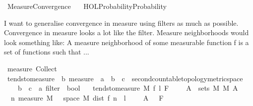 %
\begin{isabellebody}%
%
%
\isadelimtheory
%
\endisadelimtheory
%
\isatagtheory
{}\isamarkupfalse%
\ Measure{\isacharunderscore}{\kern0pt}Convergence\isanewline
\ \ \ {\isachardoublequoteopen}HOL{\isacharminus}{\kern0pt}Probability{\isachardot}{\kern0pt}Probability{\isachardoublequoteclose}\isanewline
{}%
\endisatagtheory
{\isafoldtheory}%
%
\isadelimtheory
%
\endisadelimtheory
%
\begin{isamarkuptext}%
I want to generalise convergence in measure using filters as much as possible. Convergence 
 in measure looks a lot like the  filter. Measure neighborhoods would look something like:
 A measure neighborhood of some measurable function f is a set of functions such that ...%
\end{isamarkuptext}\isamarkuptrue%
\isamarkupfalse%
\ measure\ Collect\isanewline
\isanewline
{}\isamarkupfalse%
\ tendsto{\isacharunderscore}{\kern0pt}measure\ {\isacharcolon}{\kern0pt}{\isacharcolon}{\kern0pt}\ {\isachardoublequoteopen}{\isacharprime}{\kern0pt}b\ measure\ {\isasymRightarrow}\ {\isacharparenleft}{\kern0pt}{\isacharprime}{\kern0pt}a\ {\isasymRightarrow}\ {\isacharprime}{\kern0pt}b\ {\isasymRightarrow}\ {\isacharparenleft}{\kern0pt}{\isacharprime}{\kern0pt}c\ {\isacharcolon}{\kern0pt}{\isacharcolon}{\kern0pt}\ {\isacharbraceleft}{\kern0pt}second{\isacharunderscore}{\kern0pt}countable{\isacharunderscore}{\kern0pt}topology{\isacharcomma}{\kern0pt}metric{\isacharunderscore}{\kern0pt}space{\isacharbraceright}{\kern0pt}{\isacharparenright}{\kern0pt}{\isacharparenright}{\kern0pt}\isanewline
\ \ \ {\isasymRightarrow}\ {\isacharparenleft}{\kern0pt}{\isacharprime}{\kern0pt}b\ {\isasymRightarrow}\ {\isacharprime}{\kern0pt}c{\isacharparenright}{\kern0pt}\ {\isasymRightarrow}\ {\isacharprime}{\kern0pt}a\ filter\ {\isasymRightarrow}\ bool{\isachardoublequoteclose}\isanewline
\ \ \ {\isachardoublequoteopen}tendsto{\isacharunderscore}{\kern0pt}measure\ M\ f\ l\ F\ {\isasymequiv}\ {\isasymforall}{\isasymepsilon}\ {\isachargreater}{\kern0pt}\ {}{\isachardot}{\kern0pt}\ {\isasymforall}A\ {\isasymin}\ sets\ M{\isachardot}{\kern0pt}\ M\ A\ {\isasymnoteq}\ {\isasyminfinity}\ {\isasymlongrightarrow}\isanewline
\ \ {\isacharparenleft}{\kern0pt}{\isacharparenleft}{\kern0pt}{\isasymlambda}n{\isachardot}{\kern0pt}\ measure\ M\ {\isacharparenleft}{\kern0pt}{\isacharbraceleft}{\kern0pt}{\isasymomega}\ {\isasymin}\ space\ M{\isachardot}{\kern0pt}\ dist\ {\isacharparenleft}{\kern0pt}f\ n\ {\isasymomega}{\isacharparenright}{\kern0pt}\ {\isacharparenleft}{\kern0pt}l\ {\isasymomega}{\isacharparenright}{\kern0pt}\ {\isachargreater}{\kern0pt}\ {\isasymepsilon}{\isacharbraceright}{\kern0pt}\ {\isasyminter}\ A{\isacharparenright}{\kern0pt}{\isacharparenright}{\kern0pt}\ {\isasymlonglongrightarrow}\ {}{\isacharparenright}{\kern0pt}\ F{\isachardoublequoteclose}\isanewline

\end{isabellebody}
